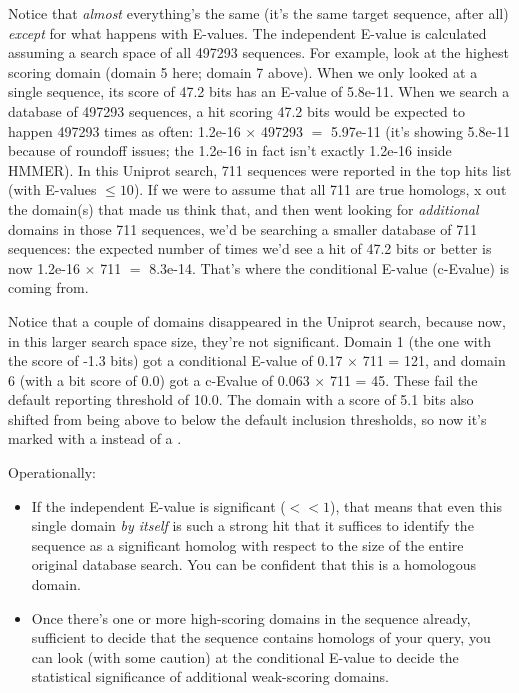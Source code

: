 Notice that \emph{almost} everything's the same (it's the same target
sequence, after all) \emph{except} for what happens with E-values. The
independent E-value is calculated assuming a search space of all
497293 sequences. For example, look at the highest scoring domain
(domain 5 here; domain 7 above). When we only looked at a single
sequence, its score of 47.2 bits has an E-value of 5.8e-11. When we
search a database of 497293 sequences, a hit scoring 47.2 bits would
be expected to happen 497293 times as often: 1.2e-16 $\times$ 497293
$=$ 5.97e-11 (it's showing 5.8e-11 because of roundoff issues; the
1.2e-16 in fact isn't exactly 1.2e-16 inside HMMER). In this Uniprot
search, 711 sequences were reported in the top hits list (with
E-values $\leq 10$). If we were to assume that all 711 are true
homologs, x out the domain(s) that made us think that, and then went
looking for \emph{additional} domains in those 711 sequences, we'd be
searching a smaller database of 711 sequences: the expected number of
times we'd see a hit of 47.2 bits or better is now 1.2e-16 $\times$
711 $=$ 8.3e-14. That's where the conditional E-value (c-Evalue) is
coming from.

Notice that a couple of domains disappeared in the Uniprot search,
because now, in this larger search space size, they're not
significant. Domain 1 (the one with the score of -1.3 bits) got a
conditional E-value of 0.17 $\times$ 711 = 121, and domain 6 (with a
bit score of 0.0) got a c-Evalue of 0.063 $\times$ 711 = 45. These
fail the default reporting threshold of 10.0. The domain with a score
of 5.1 bits also shifted from being above to below the default
inclusion thresholds, so now it's marked with a  instead of a
\ccode{!}.

Operationally:

\begin{itemize}
\item If the independent E-value is significant ($<<1$), that means
that even this single domain \emph{by itself} is such a strong hit
that it suffices to identify the sequence as a significant homolog
with respect to the size of the entire original database search. You
can be confident that this is a homologous domain.

\item Once there's one or more high-scoring domains in the sequence
already, sufficient to decide that the sequence contains homologs of
your query, you can look (with some caution) at the conditional
E-value to decide the statistical significance of additional
weak-scoring domains.
\end{itemize}

